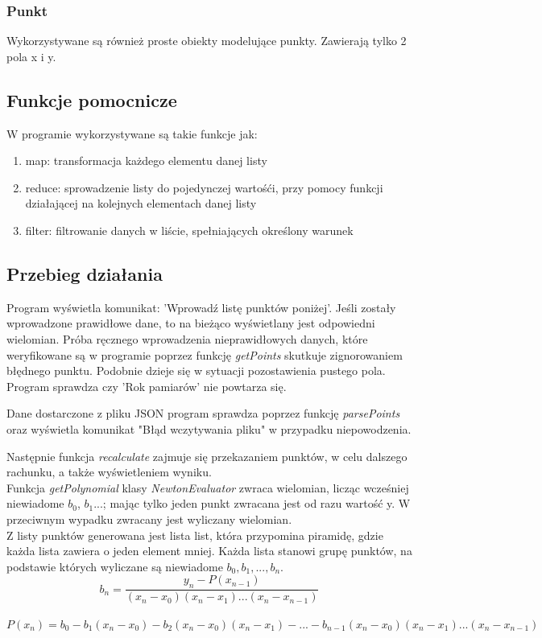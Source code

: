 \documentclass[12pt]{article}
\begin{document}
\subsubsection{Punkt}
Wykorzystywane są również proste obiekty modelujące punkty. Zawierają tylko 2 pola x i y.
\subsection{Funkcje pomocnicze}

W programie wykorzystywane są takie funkcje jak:
\begin{enumerate}
\item map: transformacja każdego elementu danej listy 
\item reduce: sprowadzenie listy do pojedynczej wartośći, przy pomocy funkcji działającej na kolejnych elementach danej listy 
\item filter: filtrowanie danych w liście, spełniających określony warunek
\end{enumerate}
\subsection{Przebieg działania}
Program wyświetla komunikat: 'Wprowadź listę punktów poniżej'. Jeśli zostały wprowadzone prawidłowe dane, to na bieżąco wyświetlany jest odpowiedni wielomian. 
Próba ręcznego wprowadzenia nieprawidłowych danych, które weryfikowane są w programie poprzez funkcję \emph{getPoints} skutkuje zignorowaniem błędnego punktu. Podobnie dzieje się w sytuacji pozostawienia pustego pola.
Program sprawdza czy 'Rok pamiarów' nie powtarza się.
\par Dane dostarczone z pliku JSON program sprawdza poprzez funkcję \emph{parsePoints} oraz wyświetla komunikat "Błąd wczytywania pliku" w przypadku niepowodzenia.\\
\par Następnie funkcja \emph{recalculate} zajmuje się przekazaniem punktów, w celu dalszego rachunku, a także wyświetleniem wyniku.\\
Funkcja \emph{getPolynomial} klasy \emph{NewtonEvaluator} zwraca wielomian, licząc wcześniej niewiadome $b_0$, $b_1$...; mając tylko jeden punkt zwracana jest od razu wartość y. W przeciwnym wypadku zwracany jest wyliczany wielomian. 
\\
Z listy punktów generowana jest lista list, która przypomina piramidę, gdzie każda lista zawiera o jeden element mniej.
Każda lista stanowi grupę punktów, na podstawie których wyliczane są niewiadome $b_0,b_1,...,b_n$.\\
$$b_{n}=\frac{y_{n}-P(x_{n-1})} { (x_n-x_0)(x_n-x_1)...(x_n-x_{n-1})} $$\\
$$P(x_{n})=b_{0}-b_{1}(x_n-x_{0})-b_2(x_n-x_0)(x_n-x_1)-...-b_{n-1}(x_n-x_0)(x_n-x_1)...(x_n-x_{n-1})$$
\end{document}
